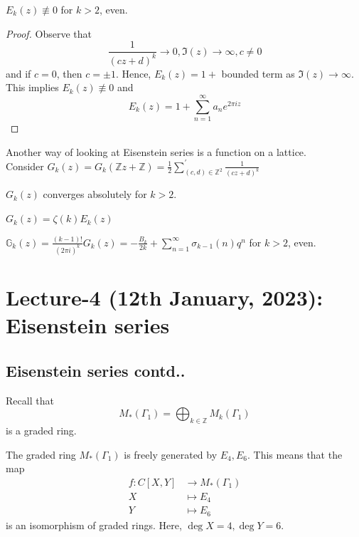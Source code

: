 \documentclass[oneside, 12pt]{scrbook}
\newcommand{\ZZ}{\mathbb Z}
\theoremstyle{theorem}
\begin{document}
\begin{proposition}
$E_{k}(z) \not \equiv 0$ for $k>2$, even.
\end{proposition}

\begin{proof}
Observe that $$\frac{1}{(cz+d)^k} \rightarrow 0 , \mathfrak{I}(z) \rightarrow \infty , c\neq 0$$ and if $c = 0$, then $c=\pm 1$. Hence, $E_{k}(z) = 1 +$ bounded term as $\mathfrak{I}(z) \rightarrow \infty$. This implies $E_{k}(z) \not \equiv 0$ and $$E_{k}(z) = 1 + \sum_{n=1}^{\infty} a_{n}e^{2 \pi i z}$$
\end{proof}

Another way of looking at Eisenstein series is a function on a lattice. \\
Consider $G_{k}(z) = G_{k}(\ZZ z + \ZZ) = \frac{1}{2} \sum_{(c,d) \in \ZZ^2}^{'} \frac{1}{(cz+d)^k}$

\begin{proposition}
$G_{k}(z)$ converges absolutely for $k>2$.
\end{proposition} 

\begin{proposition}
$G_{k}(z) = \zeta(k) E_{k}(z)$
\end{proposition}

\begin{proposition}
$\mathbb{G}_{k}(z) = \frac{(k-1)!}{(2 \pi i)^k} G_{k}(z) = -\frac{B_{k}}{2k} + \sum_{n=1}^{\infty} \sigma_{k-1}(n)q^n$ for $k>2$, even.
\end{proposition}

\chapter{Lecture-4 (12th January, 2023): Eisenstein series}

\section{Eisenstein series contd..}

Recall that $$M_{*}(\Gamma_{1}) = \bigoplus_{k \in \ZZ}M_{k}(\Gamma_{1})$$  is a graded ring.

\begin{proposition}
The graded ring $M_{*}(\Gamma_{1})$ is freely generated by $E_{4},E_{6}$. This means that the map 
\begin{align*}
f: C[X,Y] &\rightarrow M_{*}(\Gamma_{1})\\
X &\mapsto E_{4} \\
Y &\mapsto E_{6}
\end{align*}
is an isomorphism of graded rings. Here, $\deg X = 4, \deg Y=6$. 
\end{proposition}
\end{document}
